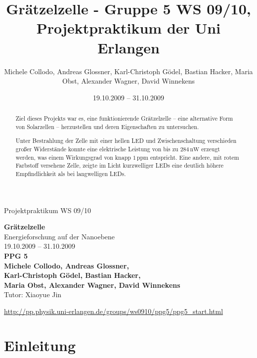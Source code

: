 \documentclass[11pt]{scrartcl}
\title{Gr\"atzelzelle - Gruppe 5 WS 09/10, Projektpraktikum der Uni Erlangen}
\date{19.10.2009 -- 31.10.2009}
\author{Michele Collodo, Andreas Glossner, Karl-Christoph G\"odel, Bastian Hacker, Maria Obst, Alexander Wagner, David Winnekens}
\newcommand{\unit}[1]{\ensuremath{\,\mathrm{#1}}} %
\begin{document}
\sloppy %
\thispagestyle{empty}
\large{Projektpraktikum WS 09/10}
\hfill
{}
\\[8\baselineskip]
\begin{center}
{\Huge\textbf{Gr\"atzelzelle}}
\\[0.5\baselineskip]
{\large Energieforschung auf der Nanoebene}
\\[1.5\baselineskip]
{\Large 19.10.2009 -- 31.10.2009}
\\[6\baselineskip]
{\huge\textbf{PPG 5}}\\[0.5\baselineskip]
{\large\textbf{
Michele Collodo,
Andreas Glossner,\\
Karl-Christoph G\"odel,
Bastian Hacker,\\
Maria Obst,
Alexander Wagner,
David Winnekens}\\
Tutor: Xiaoyue Jin}
\vfill



\small{\url{http://pp.physik.uni-erlangen.de/groups/ws0910/ppg5/ppg5\_start.html}}
\end{center}
\newpage



\tableofcontents
\vfill



\begin{abstract}
Ziel dieses Projekts war es, eine funktionierende Grätzelzelle -- eine alternative Form von Solarzellen -- herzustellen und deren Eigenschaften zu untersuchen.

Unter Bestrahlung der Zelle mit einer hellen LED und Zwischenschaltung verschieden gro\ss{}er Widerst\"ande konnte eine elektrische Leistung von bis zu $284\unit{nW}$ erzeugt werden, was einem Wirkungsgrad von knapp $1\unit{ppm}$ entspricht. Eine andere, mit rotem Farbstoff versehene Zelle, zeigte im Licht kurzwelliger LEDs eine deutlich h\"ohere Empfindlichkeit als bei langwelligen LEDs.

\end{abstract}
\newpage





\section{Einleitung}
\end{document}
